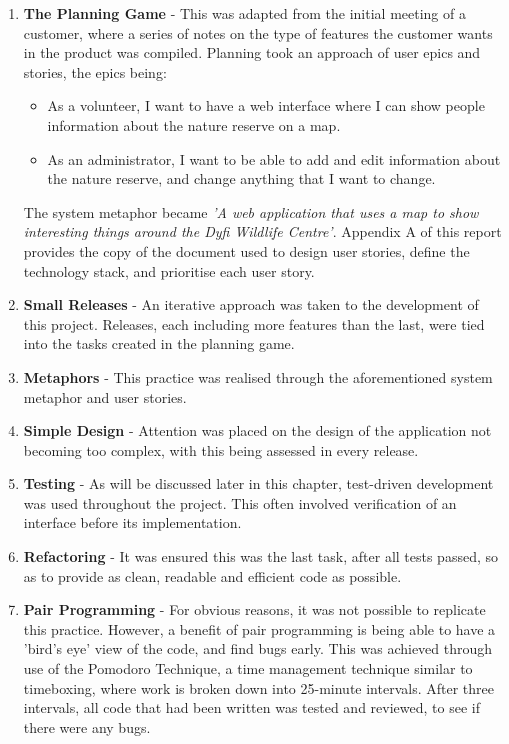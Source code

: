 \begin{enumerate}
\item \textbf{The Planning Game} - This was adapted from the initial meeting of a customer, where a series of notes on the type of features the customer wants in the product was compiled. Planning took an approach of user epics and stories, the epics being:
	\begin{itemize}
		\item	As a volunteer, I want to have a web interface where I can show people information about the nature reserve on a map.
		\item	As an administrator, I want to be able to add and edit information about the nature reserve, and change anything that I want to change.
	\end{itemize}
	
The system metaphor became \textit{'A web application that uses a map to show interesting things around the Dyfi Wildlife Centre'}. Appendix A of this report provides the copy of the document used to design user stories, define the technology stack, and prioritise each user story.
\item	\textbf{Small Releases} - An iterative approach was taken to the development of this project. Releases, each including more features than the last, were tied into the tasks created in the planning game.
\item	\textbf{Metaphors} - This practice was realised through the aforementioned system metaphor and user stories.
\item	\textbf{Simple Design} - Attention was placed on the design of the application not becoming too complex, with this being assessed in every release.
\item	\textbf{Testing} - As will be discussed later in this chapter, test-driven development was used throughout the project. This often involved verification of an interface before its implementation.
\item	\textbf{Refactoring} - It was ensured this was the last task, after all tests passed, so as to provide as clean, readable and efficient code as possible.
\item	\textbf{Pair Programming} - For obvious reasons, it was not possible to replicate this practice. However, a benefit of pair programming is being able to have a 'bird's eye' view of the code, and find bugs early. This was achieved through use of the Pomodoro Technique, a time management technique similar to timeboxing, where work is broken down into 25-minute intervals\cite{GavettGretchen2018Yvtc}. After three intervals, all code that had been written was tested and reviewed, to see if there were any bugs.

\end{enumerate}
